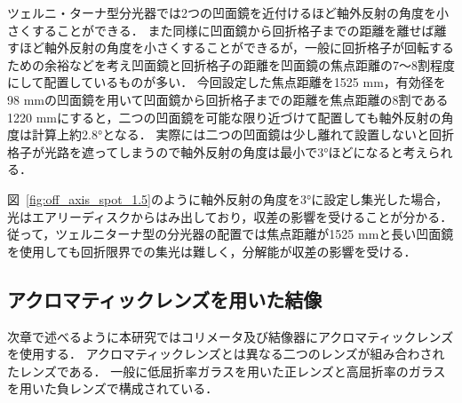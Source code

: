 ツェルニ・ターナ型分光器では2つの凹面鏡を近付けるほど軸外反射の角度を小さくすることができる．
また同様に凹面鏡から回折格子までの距離を離せば離すほど軸外反射の角度を小さくすることができるが，一般に回折格子が回転するための余裕などを考え凹面鏡と回折格子の距離を凹面鏡の焦点距離の7～8割程度にして配置しているものが多い．
今回設定した焦点距離を1525 mm，有効径を98 mmの凹面鏡を用いて凹面鏡から回折格子までの距離を焦点距離の8割である1220 mmにすると，二つの凹面鏡を可能な限り近づけて配置しても軸外反射の角度は計算上約2.8°となる．
実際には二つの凹面鏡は少し離れて設置しないと回折格子が光路を遮ってしまうので軸外反射の角度は最小で3°ほどになると考えられる．

図\ \ref{fig:off_axis_spot_1.5}のように軸外反射の角度を3°に設定し集光した場合，光はエアリーディスクからはみ出しており，収差の影響を受けることが分かる．
従って，ツェルニターナ型の分光器の配置では焦点距離が1525 mmと長い凹面鏡を使用しても回折限界での集光は難しく，分解能が収差の影響を受ける．


\subsection{アクロマティックレンズを用いた結像}

次章で述べるように本研究ではコリメータ及び結像器にアクロマティックレンズを使用する．
アクロマティックレンズとは異なる二つのレンズが組み合わされたレンズである．
一般に低屈折率ガラスを用いた正レンズと高屈折率のガラスを用いた負レンズで構成されている．

